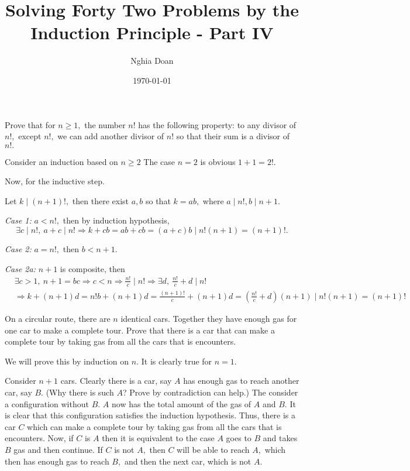 \documentclass{article}
\title{Solving Forty Two Problems by the Induction Principle - Part IV}
\author{Nghia Doan}
\date{\today}
\begin{document}
\maketitle

\begin{problem}
    Prove that for $n \ge 1,$ the number $n!$ has the following property: to any divisor of $n!,$ except $n!,$
    we can add another divisor of $n!$ so that their sum is a divisor of $n!.$
\end{problem}

\begin{soln}
    Consider an induction based on $n \ge 2$ The case $n=2$ is obvious $1+1 = 2!.$
    
    Now, for the inductive step. 
    
    Let $k \mid (n+1)!,$ then there exist $a,b$ so that $k = ab,$ where $a \mid n!, b \mid n+1.$

    \textit{Case 1:} $a <n!,$ then by induction hypothesis,
    \[
        \exists c \mid n!,\ a+c \mid n! \Rightarrow k+cb = ab+cb =(a+c)b \mid n!(n+1) = (n+1)!.
    \]

    \textit{Case 2:} $a =n!,$ then $b < n+1.$
    
    \textit{Case 2a:} $n+1$ is composite, then
    \[
        \begin{aligned}
            &\exists c > 1,\ n+1 = bc \Rightarrow c < n \Rightarrow \frac{n!}{c} \mid n! \Rightarrow \exists d,\  \frac{n!}{c}+d \mid n!\\
            &\Rightarrow k + (n+1)d = n!b + (n+1)d = \frac{(n+1)!}{c} + (n+1)d  =  \left( \frac{n!}{c} + d \right) (n+1) \mid n!(n+1) = (n+1)!
        \end{aligned}
    \]
\end{soln}

\begin{problem}
    On a circular route, there are $n$ identical cars. Together they have enough gas for one car to make a complete tour.
    Prove that there is a car that can make a complete tour by taking gas from all the cars that is encounters.
\end{problem}

\begin{soln}
    We will prove this by induction on $n.$ It is clearly true for $n=1.$

    Consider $n+1$ cars. Clearly there is a car, say $A$ has enough gas to reach another car, say $B.$ (Why there is such $A$? Prove by contradiction can help.)
    The consider a configuration without $B.$ $A$ now has the total amount of the gas of $A$ and $B.$ It is clear that this configuration satisfies the induction hypothesis.
    Thus, there is a car $C$ which can make a complete tour by taking gas from all the cars that is encounters.
    Now, if $C$ is $A$ then it is equivalent to the case $A$ goes to $B$ and takes $B$ gas and then continue.
    If $C$ is not $A,$ then $C$ will be able to reach $A,$ which then has enough gas to reach $B,$ and then the next car, which is not $A$.
\end{soln}
\end{document}
